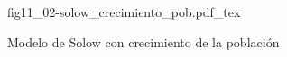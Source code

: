 \begin{figure}[h]
\centering
\def\svgwidth{0.5\textwidth}
{fig11_02-solow_crecimiento_pob.pdf_tex}
\caption{Modelo de Solow con crecimiento de la población}
\label{fig11_02-solow_crecimiento_pob}
\end{figure}